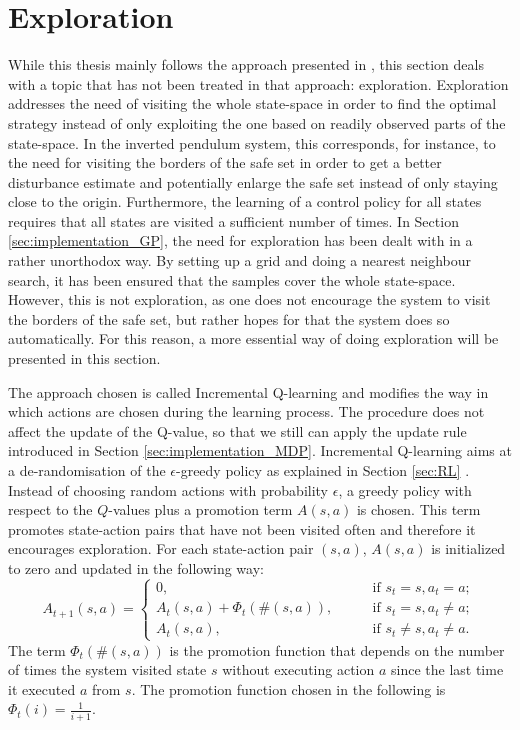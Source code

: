 \documentclass[../main.tex]{subfiles}
\begin{document}
\section{Exploration} \label{sec:Exploration}
While this thesis mainly follows the approach presented in \cite{akametalu2014reachability}, this section deals with a topic that has not been treated in that approach: exploration. Exploration addresses the need of visiting the whole state-space in order to find the optimal strategy instead of only exploiting the one based on readily observed parts of the state-space. In the inverted pendulum system, this corresponds, for instance, to the need for visiting the borders of the safe set in order to get a better disturbance estimate and potentially enlarge the safe set instead of only staying close to the origin. Furthermore, the learning of a control policy for all states requires that all states are visited a sufficient number of times. In Section \ref{sec:implementation_GP}, the need for exploration has been dealt with in a rather unorthodox way. By setting up a grid and doing a nearest neighbour search, it has been ensured that the samples cover the whole state-space. However, this is not exploration, as one does not encourage the system to visit the borders of the safe set, but rather hopes for that the system does so automatically. For this reason, a more essential way of doing exploration will be presented in this section. \par 
The approach chosen is called Incremental Q-learning and modifies the way in which actions are chosen during the learning process. The procedure does not affect the update of the Q-value, so that we still can apply the update rule introduced in Section \ref{sec:implementation_MDP}. Incremental Q-learning aims at a de-randomisation of the $\epsilon$-greedy policy as explained in Section \ref{sec:RL} \cite{even2001convergence}. Instead of choosing random actions with probability $\epsilon$, a greedy policy with respect to the $Q$-values plus a promotion term $A(s,a)$ is chosen. This term promotes state-action pairs that have not been visited often and therefore it encourages exploration. For each state-action pair $(s,a)$, $A(s,a)$ is initialized to zero and updated in the following way:
\begin{equation}
    A_{t+1}(s,a) = 
\begin{cases}
    0,\qquad &\text{if } s_t = s, a_t = a;\\    
    A_{t}(s,a) + \Phi_t(\#(s,a)),\qquad &\text{if } s_t = s, a_t \neq a;\\
    A_{t}(s,a),\qquad &\text{if } s_t \neq s, a_t \neq a.
\end{cases}
\end{equation}
The term $\Phi_t(\#(s,a))$ is the promotion function that depends on the number of times the system visited state $s$ without executing action $a$ since the last time it executed $a$ from $s$. The promotion function chosen in the following is $\Phi_t(i) = \frac{1}{i+1}$. 
\end{document}
